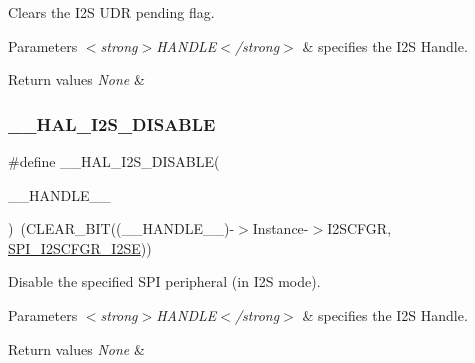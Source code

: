 Clears the I2S U\+DR pending flag. 


\begin{DoxyParams}{Parameters}
{\em $<$strong$>$\+H\+A\+N\+D\+L\+E$<$/strong$>$} & specifies the I2S Handle. \\
\hline
\end{DoxyParams}

\begin{DoxyRetVals}{Return values}
{\em None} & \\
\hline
\end{DoxyRetVals}
\mbox{\label{group___i2_s___exported__macros_gac4f398db7f68fb8354bff61a9a6372b9}} 
\subsubsection{\texorpdfstring{\+\_\+\+\_\+\+H\+A\+L\+\_\+\+I2\+S\+\_\+\+D\+I\+S\+A\+B\+LE}{\_\_HAL\_I2S\_DISABLE}}
{\footnotesize\ttfamily \#define \+\_\+\+\_\+\+H\+A\+L\+\_\+\+I2\+S\+\_\+\+D\+I\+S\+A\+B\+LE(\begin{DoxyParamCaption}\item[{}]{\+\_\+\+\_\+\+H\+A\+N\+D\+L\+E\+\_\+\+\_\+ }\end{DoxyParamCaption})~(C\+L\+E\+A\+R\+\_\+\+B\+IT((\+\_\+\+\_\+\+H\+A\+N\+D\+L\+E\+\_\+\+\_\+)-\/$>$Instance-\/$>$I2\+S\+C\+F\+GR, \hyperlink{group___peripheral___registers___bits___definition_ga30d76c7552c91bbd5cbac70d9c56ebb3}{S\+P\+I\+\_\+\+I2\+S\+C\+F\+G\+R\+\_\+\+I2\+SE}))}



Disable the specified S\+PI peripheral (in I2S mode). 


\begin{DoxyParams}{Parameters}
{\em $<$strong$>$\+H\+A\+N\+D\+L\+E$<$/strong$>$} & specifies the I2S Handle. \\
\hline
\end{DoxyParams}

\begin{DoxyRetVals}{Return values}
{\em None} & \\
\hline
\end{DoxyRetVals}
\mbox{\label{group___i2_s___exported__macros_gaa78db4341e43a5fb30c815b22137a9e7}} 
